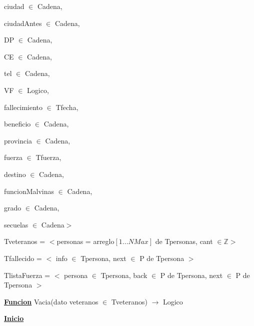 \documentclass{article}
\begin{document}
        \hspace{8mm}ciudad $\in$ Cadena, 

        \hspace{8mm}ciudadAntes $\in$ Cadena, 
        
        \hspace{8mm}DP $\in$ Cadena, 
        
        \hspace{8mm}CE $\in$ Cadena, 
        
        \hspace{8mm}tel $\in$ Cadena, 
        
        \hspace{8mm}VF $\in$ Logico, 
        
        \hspace{8mm}fallecimiento $\in$ Tfecha,

        \hspace{8mm}beneficio $\in$ Cadena,

        \hspace{8mm}provincia $\in$ Cadena,

        \hspace{8mm}fuerza $\in$ Tfuerza,

        \hspace{8mm}destino $\in$ Cadena,

        \hspace{8mm}funcionMalvinas $\in$ Cadena,

        \hspace{8mm}grado $\in$ Cadena,

        \hspace{8mm}secuelas $\in$ Cadena$>$

    \hspace{4mm}Tveteranos = $<$personas = arreglo$[1...NMax]$ de Tpersonas, cant $\in \mathbb{Z}$$>$

    \hspace{4mm}Tfallecido = $<$ info $\in$ Tpersona, next $\in$ P de Tpersona $>$

    \hspace{4mm}TlistaFuerza = $<$ persona $\in$ Tpersona, back $\in$ P de Tpersona, next $\in$ P de Tpersona $>$

    \vspace{4mm}

    \hspace{4mm}\underline{\textbf{Funcion}} Vacia(dato veteranos $\in$ Tveteranos) $\rightarrow$ Logico

        \hspace{8mm}\underline{\textbf{Inicio}}
\end{document}
